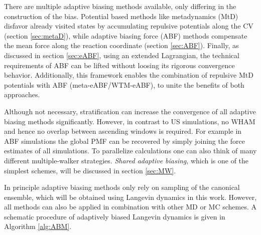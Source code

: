 There are multiple adaptive biasing methods available, only differing in the construction of the bias. Potential based methods like metadynamics (MtD) disfavor already visited states by accumulating repulsive potentials along the CV (section \ref{sec:metaD}), while adaptive biasing force (ABF) methods compensate the mean force along the reaction coordinate (section \ref{sec:ABF}). Finally, as discussed in section \ref{sec:eABF}, using an extended Lagrangian, the technical requirements of ABF can be lifted without loosing its rigorous convergence behavior.\autocite{lesage2017smoothed} Additionally, this framework enables the combination of repulsive MtD potentials with ABF (meta-eABF/WTM-eABF), to unite the benefits of both approaches.\autocite{fu2018zooming,fu2019taming}

Although not necessary, stratification can increase the convergence of all adaptive biasing methods significantly. However, in contrast to US simulations, no WHAM and hence no overlap between ascending windows is required. For example in ABF simulations the global PMF can be recovered by simply joining the force estimates of all simulations.\autocite{comer2015adaptive}
To parallelize calculations one can also think of many different multiple-walker strategies.\autocite{wilson2011molecular,comer2014calculation,minoukadeh2010potential}
\textit{Shared adaptive biasing}, which is one of the simplest schemes, will be discussed in section \ref{sec:MW}.

In principle adaptive biasing methods only rely on sampling of the canonical ensemble, which will be obtained using Langevin dynamics in this work. However, all methods can also be applied in combination with other MD or MC schemes. A schematic procedure of adaptively biased Langevin dynamics is given in Algorithm \ref{alg:ABM}.

